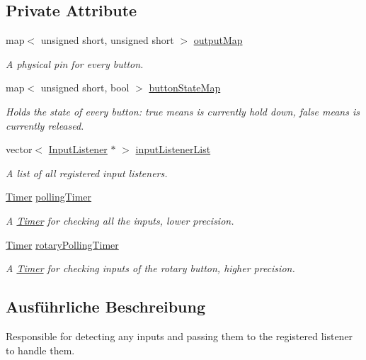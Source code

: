 \subsection*{Private Attribute}
\begin{DoxyCompactItemize}
\item 
map$<$ unsigned short, unsigned short $>$ \hyperlink{class_rasp_input_controller_a7b59eba5cc562eccc91347ddbd777e50}{output\+Map}
\begin{DoxyCompactList}\small\item\em A physical pin for every button. \end{DoxyCompactList}\item 
map$<$ unsigned short, bool $>$ \hyperlink{class_rasp_input_controller_ae02dcbb81abe6b6e6e3eaaeef4f3bf4a}{button\+State\+Map}
\begin{DoxyCompactList}\small\item\em Holds the state of every button\+: true means is currently hold down, false means is currently released. \end{DoxyCompactList}\item 
vector$<$ \hyperlink{class_input_listener}{Input\+Listener} $\ast$ $>$ \hyperlink{class_rasp_input_controller_a5a5a8d99d69c35e206ddf7467e36cfae}{input\+Listener\+List}
\begin{DoxyCompactList}\small\item\em A list of all registered input listeners. \end{DoxyCompactList}\item 
\hyperlink{class_timer}{Timer} \hyperlink{class_rasp_input_controller_a388779c1ddf9f5910a92cd350cc59e5c}{polling\+Timer}
\begin{DoxyCompactList}\small\item\em A \hyperlink{class_timer}{Timer} for checking all the inputs, lower precision. \end{DoxyCompactList}\item 
\hyperlink{class_timer}{Timer} \hyperlink{class_rasp_input_controller_a55b065ae154806341fd900a8b61110a5}{rotary\+Polling\+Timer}
\begin{DoxyCompactList}\small\item\em A \hyperlink{class_timer}{Timer} for checking inputs of the rotary button, higher precision. \end{DoxyCompactList}\end{DoxyCompactItemize}


\subsection{Ausführliche Beschreibung}
Responsible for detecting any inputs and passing them to the registered listener to handle them. 

